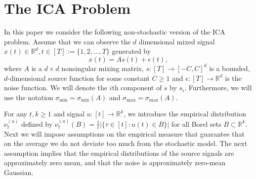 \documentclass[twoside,11pt]{article}
\newcommand{\real}{\mathbb{R}}
\newcommand{\R}{\real}
\newcommand{\iid}{i.i.d.\xspace}
\begin{document}
\section{The ICA Problem}
\label{sec:Preliminaries}
In this paper we consider the following non-stochastic version of the ICA problem.
Assume that we can observe the $d$ dimensional mixed signal $x(t) \in \R^d, t \in [T]:=\{1,2,\ldots,T\}$ generated by  
\begin{equation}
\label{eq:ICA}
x(t) = As(t)+\epsilon(t), 
\end{equation}
where $A$ is a $d\times d$ nonsingular mixing matrix,  $s:[T] \to [-C,C]^d$ is a bounded, $d$-dimensional source function for some constant $C \ge 1$ and $\epsilon:[T] \to \R^d$ is the noise function. We will denote the $i$th component of $s$ by $s_i$. 
Furthermore, we will use the notation $\sigma_{\min}=\sigma_{\min}(A)$ and
$\sigma_{\max}=\sigma_{\max}(A)$.

For any $t,k \ge 1$ and signal $u:[t] \to \R^k$, we introduce the empirical distribution $\nu_t^{(u)}$ defined by
$\nu_t^{(u)}(B)=\tfrac{1}{t}|\{\tau \in [t]: u(t) \in B\}|$ for all Borel sets $B \subset \R^k$. Next we will impose assumptions on the empirical measure that guarantee that on the average we do not deviate too much from the stochastic model. The next assumption implies that the empirical distributions of the source signals are approximately zero mean, and that the noise is approximately zero-mean Gaussian.
\end{document}
